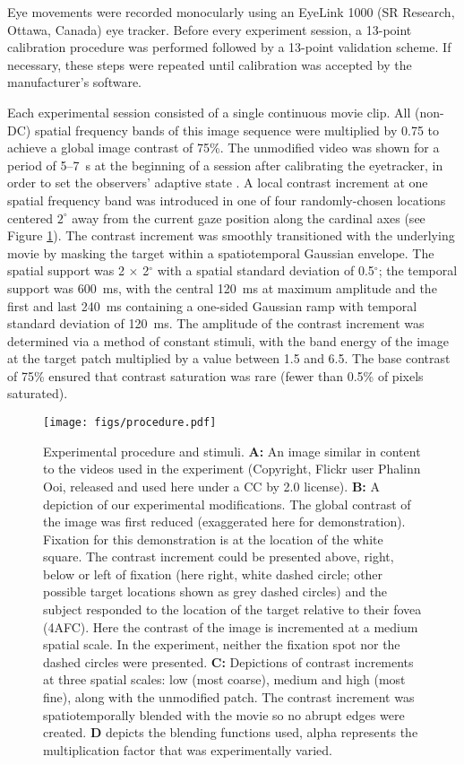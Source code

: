 \documentclass[11pt,a4paper]{article}
\begin{document}
Eye movements were recorded monocularly using an EyeLink 1000 (SR Research, Ottawa, Canada) eye tracker.
Before every experiment session, a 13-point calibration procedure was performed followed by a 13-point validation scheme.
If necessary, these steps were repeated until calibration was accepted by the manufacturer's software.

Each experimental session consisted of a single continuous movie clip.
All (non-DC) spatial frequency bands of this image sequence were multiplied by 0.75 to achieve a global image contrast of 75\%.
The unmodified video was shown for a period of 5--7~s at the beginning of a session after calibrating the eyetracker, in order to set the observers' adaptive state \citep{Bex2009}.
A local contrast increment at one spatial frequency band was introduced in one of four randomly-chosen locations centered $2^\circ$ away from the current gaze position along the cardinal axes (see Figure \ref{fig:procedure}).
The contrast increment was smoothly transitioned with the underlying movie by masking the target within a spatiotemporal Gaussian envelope.
The spatial support was 2 $\times$ 2$^\circ$ with a spatial standard deviation of 0.5$^\circ$; the temporal support was 600~ms, with the central 120~ms at maximum amplitude and the first and last 240~ms containing a one-sided Gaussian ramp with temporal standard deviation of 120~ms.
The amplitude of the contrast increment was determined via a method of constant stimuli, with the band energy of the image at the target patch multiplied by a value between 1.5 and 6.5.
The base contrast of 75\% ensured that contrast saturation was rare (fewer than 0.5\% of pixels saturated).

\begin{figure}[H]
\centering
\texttt{[image: figs/procedure.pdf]}
\caption{
Experimental procedure and stimuli.
\textbf{A:} An image similar in content to the videos used in the experiment (Copyright, Flickr user Phalinn Ooi, released and used here under a CC by 2.0 license).
\textbf{B:} A depiction of our experimental modifications.
The global contrast of the image was first reduced (exaggerated here for demonstration).
Fixation for this demonstration is at the location of the white square.
The contrast increment could be presented above, right, below or left of fixation (here right, white dashed circle; other possible target locations shown as grey dashed circles) and the subject responded to the location of the target relative to their fovea (4AFC).
Here the contrast of the image is incremented at a medium spatial scale.
In the experiment, neither the fixation spot nor the dashed circles were presented.
\textbf{C:} Depictions of contrast increments at three spatial scales: low (most coarse), medium and high (most fine), along with the unmodified patch. 
The contrast increment was spatiotemporally blended with the movie so no abrupt edges were created.
\textbf{D} depicts the blending functions used, alpha represents the multiplication factor that was experimentally varied.
}
\label{fig:procedure}
\end{figure}
\end{document}

